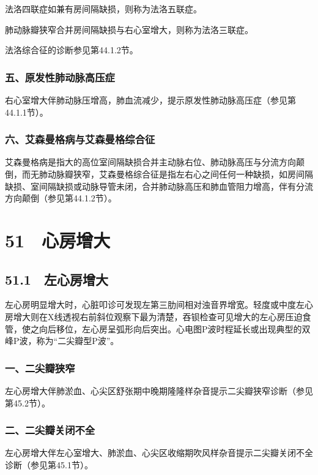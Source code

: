 法洛四联症如兼有房间隔缺损，则称为法洛五联症。

肺动脉瓣狭窄合并房间隔缺损与右心室增大，则称为法洛三联症。

法洛综合征的诊断参见第44.1.2节。

\subsubsection{五、原发性肺动脉高压症}

右心室增大伴肺动脉压增高，肺血流减少，提示原发性肺动脉高压症（参见第44.1.1节）。

\subsubsection{六、艾森曼格病与艾森曼格综合征}

艾森曼格病是指大的高位室间隔缺损合并主动脉右位、肺动脉高压与分流方向颠倒，而无肺动脉瓣狭窄，艾森曼格综合征是指左右心之间任何一种缺损，如房间隔缺损、室间隔缺损或动脉导管未闭，合并肺动脉高压和肺血管阻力增高，伴有分流方向颠倒（参见第44.1.2节）。

\protect\hypertarget{text00136.html}{}{}

\section{51　心房增大}

\subsection{51.1　左心房增大}

左心房明显增大时，心脏叩诊可发现左第三肋间相对浊音界增宽。轻度或中度左心房增大则在X线透视右前斜位观察下最为清楚，吞钡检查可见增大的左心房压迫食管，使之向后移位，左心房呈弧形向后突出。心电图P波时程延长或出现典型的双峰P波，称为“二尖瓣型P波”。

\subsubsection{一、二尖瓣狭窄}

左心房增大伴肺淤血、心尖区舒张期中晚期隆隆样杂音提示二尖瓣狭窄诊断（参见第45.2节）。

\subsubsection{二、二尖瓣关闭不全}

左心房增大伴左心室增大、肺淤血、心尖区收缩期吹风样杂音提示二尖瓣关闭不全诊断（参见第45.1节）。

